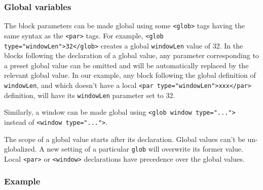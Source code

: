 \documentclass[11pt,a4paper]{article}
\begin{document}
\subsubsection*{Global variables}

The block parameters can be made global using some \verb+<glob>+ tags having
the same syntax as the \verb+<par>+ tags. For example, \verb+<glob type="windowLen">32</glob>+
creates a global \verb+windowLen+ value of 32. In
the blocks following the declaration of a global value, any parameter
corresponding to a preset global value can be omitted and will be automatically
replaced by the relevant global value. In our example, any block following the
global definition of \verb+windowLen+, and which doesn't have a local
\verb+<par type="windowLen">xxx</par>+ definition, will have its \verb+windowLen+ parameter
set to 32.

Similarly, a window can be made global using \verb+<glob window type="...">+
instead of \linebreak \verb+<window type="...">+.

The scope of a global value starts after its declaration. Global values can't
be un-globalized. A new setting of a particular \verb+glob+ will overwrite its
former value. Local \verb+<par>+ or \verb+<window>+ declarations have
precedence over the global values.


\subsubsection*{Example}
\end{document}
